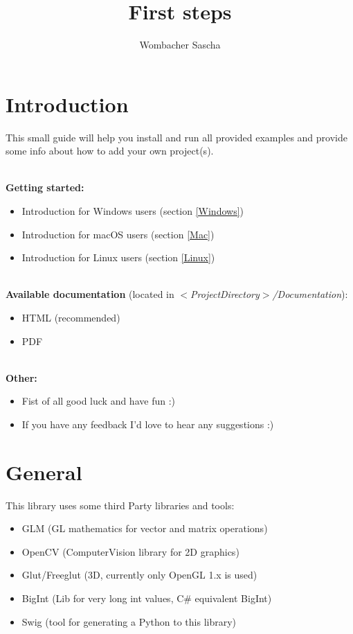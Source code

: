 \documentclass[]{article}
\title{First steps}
\author{Wombacher Sascha}
\begin{document}
\maketitle


\section{Introduction}

This small guide will help you install and run all provided examples and provide some info about how to add your own project(s).

\mbox{} \\
\textbf{Getting started:}
\begin{itemize}
	\item Introduction for Windows users (section \ref{Windows})
	\item Introduction for \space macOS \space \space users (section \ref{Mac})
	\item Introduction for \space \space Linux \space \space \space users (section \ref{Linux})
\end{itemize}

\mbox{} \\
\textbf{Available documentation} (located in \textit{$<$ProjectDirectory$>$/Documentation}):
\begin{itemize}
\item HTML (recommended)
\item PDF
\end{itemize}

\mbox{}\\
\textbf{Other:}
\begin{itemize}
	\item Fist of all good luck and have fun :)
	\item If you have any feedback I'd love to hear any suggestions :)
\end{itemize}


\section{General}
This library uses some third Party libraries and tools:
\begin{itemize}
	\item GLM (GL mathematics for vector and matrix operations)
	\item OpenCV (ComputerVision library for 2D graphics)
	\item Glut/Freeglut (3D, currently only OpenGL 1.x is used)
	\item BigInt (Lib for very long int values, C\# equivalent BigInt)
	\item Swig (tool for generating a Python to this library)
\end{itemize}
\end{document}
